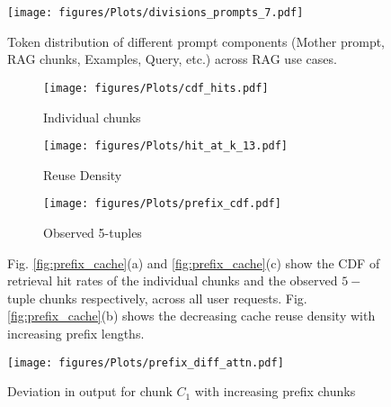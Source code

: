 

\begin{figure*}[t]
    \centering
    \begin{minipage}{0.24\textwidth}
        \centering
        \texttt{[image: figures/Plots/divisions\_prompts\_7.pdf]}
        \caption{Token distribution of different prompt components (Mother prompt, RAG chunks, Examples, Query, etc.) across RAG use cases.}
        \label{fig:prompt_parts}
    \end{minipage}
    \hfill
    \begin{minipage}{0.5\textwidth}
        \centering
        \begin{subfigure}{0.32\textwidth}
            \centering
            \texttt{[image: figures/Plots/cdf\_hits.pdf]}
            \vspace{-1.75em}
            \caption{Individual chunks}
            \label{fig:chunks_cdf}
        \end{subfigure}
        \hfill
        \begin{subfigure}{0.32\textwidth}
            \centering
            \texttt{[image: figures/Plots/hit\_at\_k\_13.pdf]}
            \vspace{-1.75em}
            \caption{Reuse Density}
            \label{fig:reuse_cdf}
        \end{subfigure}
        \hfill
        \begin{subfigure}{0.32\textwidth}
            \centering
            \texttt{[image: figures/Plots/prefix\_cdf.pdf]}
            \vspace{-1.75em}
            \caption{Observed 5-tuples}
            \label{fig:prefix_cdf}
        \end{subfigure}
        \caption{Fig. \ref{fig:prefix_cache}(a) and \ref{fig:prefix_cache}(c) show the CDF of retrieval hit rates of the individual chunks and the observed $5-$tuple chunks respectively, across all user requests. Fig. \ref{fig:prefix_cache}(b) shows the decreasing cache reuse density with increasing prefix lengths.}
        \label{fig:prefix_cache}
    \end{minipage}
    \hfill
     \begin{minipage}{0.24\textwidth}
        \centering
        \texttt{[image: figures/Plots/prefix\_diff\_attn.pdf]}
        \caption{Deviation in output for chunk $C_1$ with increasing prefix chunks}
        \label{fig:prefix_diff_attn}
    \end{minipage}
\end{figure*}


